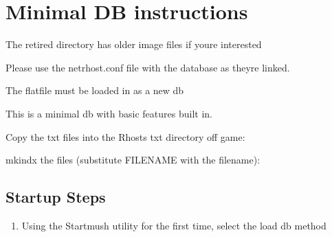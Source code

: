 \documentclass[letterpaper,10pt,english]{sphinxmanual}
\begin{document}
\section{Minimal DB instructions}
\label{\detokenize{gettingstarted:minimal-db-instructions}}
\sphinxAtStartPar
The \textquotesingle{}retired\textquotesingle{} directory has older image files if you\textquotesingle{}re interested

\sphinxAtStartPar
Please use the netrhost.conf file with the database as they\textquotesingle{}re linked.

\sphinxAtStartPar
The flatfile must be loaded in as a new db

\sphinxAtStartPar
This is a minimal db with basic \textquotesingle{}features\textquotesingle{} built in.

\sphinxAtStartPar
Copy the txt files into the Rhost\textquotesingle{}s txt directory off game:

\begin{sphinxVerbatim}[commandchars=\\\{\}]
  
\end{sphinxVerbatim}

\sphinxAtStartPar
mkindx the files (substitute FILENAME with the filename):

\begin{sphinxVerbatim}[commandchars=\\\{\}]
 
  
\end{sphinxVerbatim}


\subsection{Startup Steps}
\label{\detokenize{gettingstarted:startup-steps}}\begin{enumerate}
%
\item {} 
\sphinxAtStartPar
Using the Startmush utility for the first time, select the load db method

\end{enumerate}
\end{document}
